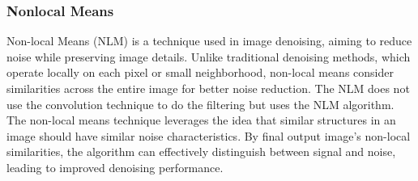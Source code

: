 \documentclass[10pt]{article}
\begin{document}
\begin{multicols}{2}
\subsubsection{Nonlocal Means}
Non-local Means (NLM) is a technique used in image denoising, aiming to reduce noise while preserving image details. Unlike traditional denoising methods, which operate locally on each pixel or small neighborhood, non-local means consider similarities across the entire image for better noise reduction. The NLM does not use the convolution technique to do the filtering but uses the NLM algorithm.
The non-local means technique leverages the idea that similar structures in an image should have similar noise characteristics. By final output image's non-local similarities, the algorithm can effectively distinguish between signal and noise, leading to improved denoising performance.


\end{multicols}
\end{document}
